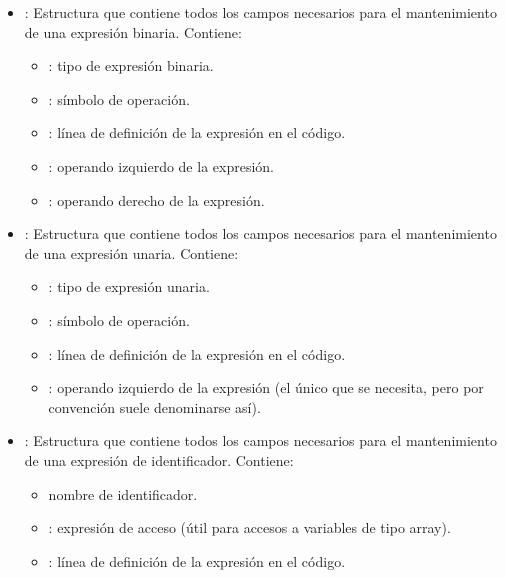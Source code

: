 \begin{itemize}
    \begin{itemize}
        \item {} : Estructura que contiene todos los campos necesarios para el mantenimiento de una expresión binaria. Contiene:
        \begin{itemize}
            \item {} : tipo de expresión binaria.
            \item {} : símbolo de operación.
            \item {} : línea de definición de la expresión en el código.
            \item {} : operando izquierdo de la expresión.
            \item {} : operando derecho de la expresión.
        \end{itemize}
    \end{itemize}
    \begin{itemize}
        \item {} : Estructura que contiene todos los campos necesarios para el mantenimiento de una expresión unaria. Contiene:
        \begin{itemize}
            \item {} : tipo de expresión unaria.
            \item {} : símbolo de operación.
            \item {} : línea de definición de la expresión en el código.
            \item {} : operando izquierdo de la expresión (el único que se necesita, pero por convención suele denominarse así).
        \end{itemize}
    \end{itemize}
    \begin{itemize}
        \item {} : Estructura que contiene todos los campos necesarios para el mantenimiento de una expresión de identificador. Contiene:
        \begin{itemize}
            \item {} nombre de identificador.
            \item {} : expresión de acceso (útil para accesos a variables de tipo array).
            \item {} : línea de definición de la expresión en el código.

\end{itemize}
\end{itemize}
\end{itemize}
